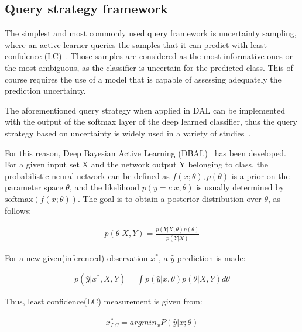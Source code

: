 \subsection{Query strategy framework}

The simplest and most commonly used query framework is uncertainty sampling, where an active learner queries the samples that it can predict with least confidence (LC)~\cite{settles2009active}. Those samples are considered as the most informative ones or the most ambiguous, as the classifier is uncertain for the predicted class. This of course requires the use of a model that is capable of assessing adequately the prediction uncertainty.

The aforementioned query strategy when applied in DAL can be implemented with the output of the softmax layer of the deep learned classifier, thus the query strategy based on uncertainty is widely used in a variety of studies~\cite{ren2020survey}.

For this reason, Deep Bayesian Active Learning (DBAL)~\cite{gal2017deep} has been developed. For a given input set $\text{X}$ and the network output $\text{Y}$ belonging to class, the probabilistic neural network can be defined as $f(x;\theta), p(\theta)$ is a prior on the parameter space $\theta$, and the likelihood $p(y = c|x,\theta)$ is usually determined by $\text{softmax}(f(x;\theta))$. The goal is to obtain a posterior distribution over $\theta$, as follows:

\begin{ceqn}
\begin{align}
    p(\theta|X,Y) = \frac{p(Y|X, \theta)p(\theta)}{p(Y|X)}
\end{align}  
\end{ceqn}

For a new given(inferenced) observation $x^*$, a $\hat{y}$ prediction is made:

\begin{ceqn}
\begin{align}
    p(\hat{y}|x^*, X, Y) = \int p(\hat{y}|x,\theta) p(\theta|X, Y)d\theta
\end{align}  
\end{ceqn}

Thus, least confidence(LC) measurement is given from:

\begin{ceqn}
\begin{align}
     x_{LC}^{*} = argmin_{x} P( \hat{y} | x;\theta ) 
\end{align}  
\end{ceqn}

